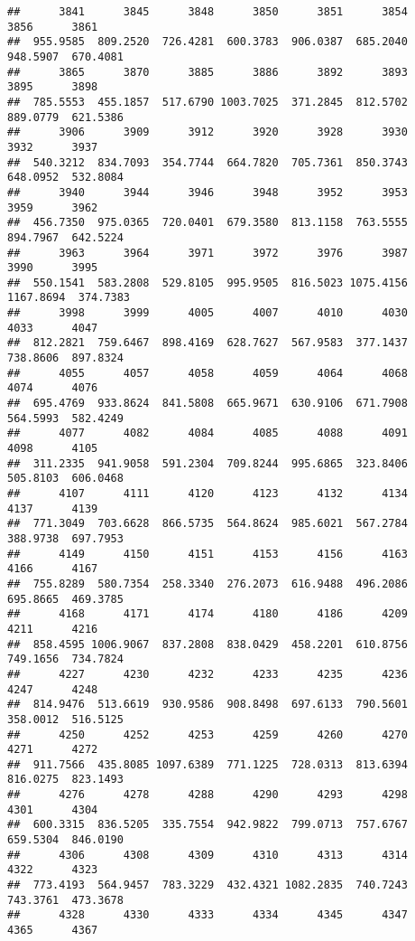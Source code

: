\documentclass[
]{article}
\begin{document}
\begin{verbatim}
##      3841      3845      3848      3850      3851      3854      3856      3861 
##  955.9585  809.2520  726.4281  600.3783  906.0387  685.2040  948.5907  670.4081 
##      3865      3870      3885      3886      3892      3893      3895      3898 
##  785.5553  455.1857  517.6790 1003.7025  371.2845  812.5702  889.0779  621.5386 
##      3906      3909      3912      3920      3928      3930      3932      3937 
##  540.3212  834.7093  354.7744  664.7820  705.7361  850.3743  648.0952  532.8084 
##      3940      3944      3946      3948      3952      3953      3959      3962 
##  456.7350  975.0365  720.0401  679.3580  813.1158  763.5555  894.7967  642.5224 
##      3963      3964      3971      3972      3976      3987      3990      3995 
##  550.1541  583.2808  529.8105  995.9505  816.5023 1075.4156 1167.8694  374.7383 
##      3998      3999      4005      4007      4010      4030      4033      4047 
##  812.2821  759.6467  898.4169  628.7627  567.9583  377.1437  738.8606  897.8324 
##      4055      4057      4058      4059      4064      4068      4074      4076 
##  695.4769  933.8624  841.5808  665.9671  630.9106  671.7908  564.5993  582.4249 
##      4077      4082      4084      4085      4088      4091      4098      4105 
##  311.2335  941.9058  591.2304  709.8244  995.6865  323.8406  505.8103  606.0468 
##      4107      4111      4120      4123      4132      4134      4137      4139 
##  771.3049  703.6628  866.5735  564.8624  985.6021  567.2784  388.9738  697.7953 
##      4149      4150      4151      4153      4156      4163      4166      4167 
##  755.8289  580.7354  258.3340  276.2073  616.9488  496.2086  695.8665  469.3785 
##      4168      4171      4174      4180      4186      4209      4211      4216 
##  858.4595 1006.9067  837.2808  838.0429  458.2201  610.8756  749.1656  734.7824 
##      4227      4230      4232      4233      4235      4236      4247      4248 
##  814.9476  513.6619  930.9586  908.8498  697.6133  790.5601  358.0012  516.5125 
##      4250      4252      4253      4259      4260      4270      4271      4272 
##  911.7566  435.8085 1097.6389  771.1225  728.0313  813.6394  816.0275  823.1493 
##      4276      4278      4288      4290      4293      4298      4301      4304 
##  600.3315  836.5205  335.7554  942.9822  799.0713  757.6767  659.5304  846.0190 
##      4306      4308      4309      4310      4313      4314      4322      4323 
##  773.4193  564.9457  783.3229  432.4321 1082.2835  740.7243  743.3761  473.3678 
##      4328      4330      4333      4334      4345      4347      4365      4367 

\end{verbatim}
\end{document}
